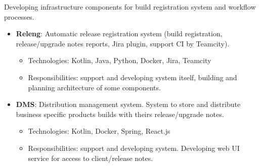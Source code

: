 \documentclass{cv}
\begin{document}
\begin{cvblock}{%
  }

  Developing infrastructure components for build registration
  system and workflow processes.

  \begin{itemize}
    \item \textbf{Releng}: Automatic release registration system
      (build registration, release/upgrade notes reports, Jira plugin,
      support CI by Teamcity).
      \begin{itemize}
        \item Technologies: Kotlin, Java, Python, Docker, Jira, Teamcity
        \item Responsibilities: support and developing system itself,
          building and planning architecture of some components.
      \end{itemize}
    \item \textbf{DMS}: Distribution management system. System to store and distribute
      business specific products builds with theirs release/upgrade notes.
      \begin{itemize}
        \item Technologies: Kotlin, Docker, Spring, React.js
        \item Responsibilities: support and developing system. Developing web
          UI service for access to client/release notes.
      \end{itemize}
  \end{itemize}
\end{cvblock}

\vspace{2em}
\end{document}
